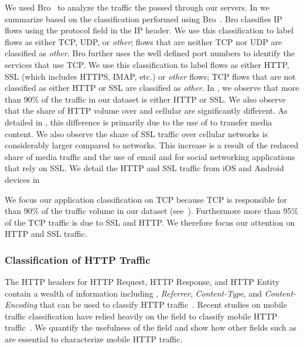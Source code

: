We used Bro~\cite{bro} to analyze the traffic the passed through our \platname servers.
In  we summarize \mobWild based on the classification performed using Bro~\cite{bro}.
Bro classifies IP flows using the protocol field in the IP header.
We use this classification to label flows as either TCP, UDP, or \emph{other}; flows that are neither TCP nor UDP are classified as \emph{other}. 
Bro further uses the well defined port numbers to identify the services that use TCP.
We use this classification to label flows as either HTTP, SSL (which includes HTTPS, IMAP, etc.) or \emph{other} flows; TCP flows that are not classified as either HTTP or SSL are classified as \emph{other}.
In , we observe that more than 90\% of the traffic in our dataset is either HTTP or SSL. 
We also observe that the share of HTTP volume over \wifi and cellular are significantly different. 
As detailed in , this difference is primarily due to the use of \wifi to transfer media content.
We also observe the share of SSL traffic over cellular networks is considerably larger compared to \wifi networks.
This increase is a result of the reduced share of media traffic and the use of email and for social networking applications that rely on SSL.
We detail the HTTP and SSL traffic from iOS and Android devices in 

We focus our application classification on TCP because TCP is responsible for than 90\% of the traffic volume in our dataset (see~).
Furthermore more than 95\% of the TCP traffic is due to SSL and HTTP.
We therefore focus our attention on HTTP and SSL traffic. 

\subsubsection{Classification of HTTP Traffic}

The HTTP headers for HTTP Request, HTTP Response, and HTTP Entity contain a wealth of information including \useragent, \emph{Referrer}, \emph{Content-Type}, and \emph{Content-Encoding} that can be used to classify HTTP traffic~\cite{rfc:http}.
Recent studies on mobile traffic classification have relied heavily on the \useragent field to classify mobile HTTP traffic~\cite{qian:webcache, maier:mobtraffic, xu:appusage}.
We quantify the usefulness of the \useragent field and show how other fields such as \httphost are essential to characterize mobile HTTP traffic. 

